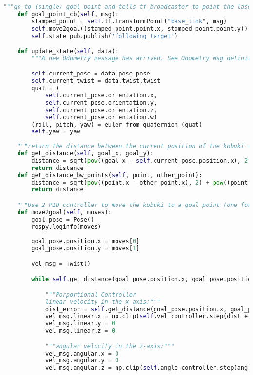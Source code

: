\begin{lstlisting}[caption={Kobuki Class},label={lst:kobukiclass},language=Python]
    """go to (single) goal point and tells tf_broadcaster to point the laser at it"""
    def goal_point_cb(self, msg):
        stamped_point = self.tf.transformPoint("base_link", msg)
        self.move2goal((stamped_point.point.x, stamped_point.point.y))
        self.state_pub.publish('following_target')

    def update_state(self, data):
        """A new Odometry message has arrived. See Odometry msg definition."""

        self.current_pose = data.pose.pose
        self.current_twist = data.twist.twist
        quat = (
            self.current_pose.orientation.x,
            self.current_pose.orientation.y,
            self.current_pose.orientation.z,
            self.current_pose.orientation.w)
        (roll, pitch, yaw) = euler_from_quaternion (quat)
        self.yaw = yaw
    
    """return the distance between the current position of the kobuki (obtained with odometry) and a goal point"""
    def get_distance(self, goal_x, goal_y):
        distance = sqrt(pow((goal_x - self.current_pose.position.x), 2) + pow((goal_y - self.current_pose.position.y), 2))
        return distance
    def get_distance_bw_points(self, point, other_point):
        distance = sqrt(pow((point.x - other_point.x), 2) + pow((point.y - other_point.y), 2))
        return distance

    """Use 2 PID controller to move the kobuki to a goal point (one for linear and one for angular velocity)"""    
    def move2goal(self, moves):
        goal_pose = Pose()
        rospy.loginfo(moves) 
        
        goal_pose.position.x = moves[0]
        goal_pose.position.y = moves[1]

        vel_msg = Twist()

        while self.get_distance(goal_pose.position.x, goal_pose.position.y) >= distance_tolerance:

            """Porportional Controller
            linear velocity in the x-axis:"""
            dist_error = self.get_distance(goal_pose.position.x, goal_pose.position.y) 
            vel_msg.linear.x = np.clip(self.vel_controller.step(dist_error, self.dt), 0.0, max_linear_speed)
            vel_msg.linear.y = 0
            vel_msg.linear.z = 0

            """angular velocity in the z-axis:"""
            vel_msg.angular.x = 0
            vel_msg.angular.y = 0
            vel_msg.angular.z = np.clip(self.angle_controller.step(angle_difference(atan2(goal_pose.position.y - self.current_pose.position.y, goal_pose.position.x - self.current_pose.position.x), self.yaw), self.dt), -max_angular_speed, max_angular_speed)


\end{lstlisting}
